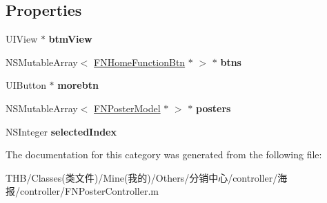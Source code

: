 \subsection*{Properties}
\begin{DoxyCompactItemize}
\item 
\mbox{\label{category_f_n_poster_controller_07_08_a68075c42fdaab9fdf20c11db92ba9904}} 
U\+I\+View $\ast$ {\bfseries btm\+View}
\item 
\mbox{\label{category_f_n_poster_controller_07_08_a47c85bfdb7edf08ad7f56d3cf8584e8a}} 
N\+S\+Mutable\+Array$<$ \mbox{\hyperlink{interface_f_n_home_function_btn}{F\+N\+Home\+Function\+Btn}} $\ast$ $>$ $\ast$ {\bfseries btns}
\item 
\mbox{\label{category_f_n_poster_controller_07_08_ad5687d3d845bc6942e7c0f019d44ca90}} 
U\+I\+Button $\ast$ {\bfseries morebtn}
\item 
\mbox{\label{category_f_n_poster_controller_07_08_a7f8e27227682db0b3634ca2169b3373a}} 
N\+S\+Mutable\+Array$<$ \mbox{\hyperlink{interface_f_n_poster_model}{F\+N\+Poster\+Model}} $\ast$ $>$ $\ast$ {\bfseries posters}
\item 
\mbox{\label{category_f_n_poster_controller_07_08_aec1918cfd80dc9b2ff4de989984e7291}} 
N\+S\+Integer {\bfseries selected\+Index}
\end{DoxyCompactItemize}


The documentation for this category was generated from the following file\+:\begin{DoxyCompactItemize}
\item 
T\+H\+B/\+Classes(类文件)/\+Mine(我的)/\+Others/分销中心/controller/海报/controller/F\+N\+Poster\+Controller.\+m\end{DoxyCompactItemize}
